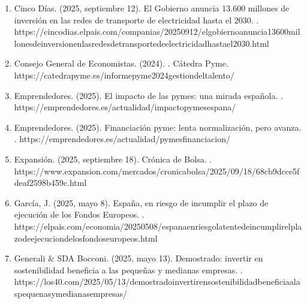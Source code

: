 \documentclass[letterpaper,10pt,spanish]{sphinxmanual}
\begin{document}
\begin{enumerate}
\item {} 
\sphinxAtStartPar
Cinco Días. (2025, septiembre 12). El Gobierno anuncia 13.600 millones de inversión en las redes de transporte de electricidad hasta el 2030. . https://cincodias.elpais.com/companias/2025\sphinxhyphen{}09\sphinxhyphen{}12/el\sphinxhyphen{}gobierno\sphinxhyphen{}anuncia\sphinxhyphen{}13600\sphinxhyphen{}millones\sphinxhyphen{}de\sphinxhyphen{}inversion\sphinxhyphen{}en\sphinxhyphen{}las\sphinxhyphen{}redes\sphinxhyphen{}de\sphinxhyphen{}transporte\sphinxhyphen{}de\sphinxhyphen{}electricidad\sphinxhyphen{}hasta\sphinxhyphen{}el\sphinxhyphen{}2030.html

\item {} 
\sphinxAtStartPar
Consejo General de Economistas. (2024). . Cátedra Pyme. https://catedrapyme.es/informe\sphinxhyphen{}pyme\sphinxhyphen{}2024\sphinxhyphen{}gestion\sphinxhyphen{}del\sphinxhyphen{}talento/

\item {} 
\sphinxAtStartPar
Emprendedores. (2025). El impacto de las pymes: una mirada española. . https://emprendedores.es/actualidad/impacto\sphinxhyphen{}pymes\sphinxhyphen{}espana/

\item {} 
\sphinxAtStartPar
Emprendedores. (2025). Financiación pyme: lenta normalización, pero avanza. . https://emprendedores.es/actualidad/pymes\sphinxhyphen{}financiacion/

\item {} 
\sphinxAtStartPar
Expansión. (2025, septiembre 18). Crónica de Bolsa. . https://www.expansion.com/mercados/cronica\sphinxhyphen{}bolsa/2025/09/18/68cb9dcce5fdeaf2598b459c.html

\item {} 
\sphinxAtStartPar
García, J. (2025, mayo 8). España, en riesgo de incumplir el plazo de ejecución de los Fondos Europeos. . https://elpais.com/economia/2025\sphinxhyphen{}05\sphinxhyphen{}08/espana\sphinxhyphen{}en\sphinxhyphen{}riesgo\sphinxhyphen{}latente\sphinxhyphen{}de\sphinxhyphen{}incumplir\sphinxhyphen{}el\sphinxhyphen{}plazo\sphinxhyphen{}de\sphinxhyphen{}ejecucion\sphinxhyphen{}de\sphinxhyphen{}los\sphinxhyphen{}fondos\sphinxhyphen{}europeos.html

\item {} 
\sphinxAtStartPar
Generali \& SDA Bocconi. (2025, mayo 13). Demostrado: invertir en sostenibilidad beneficia a las pequeñas y medianas empresas. . https://los40.com/2025/05/13/demostrado\sphinxhyphen{}invertir\sphinxhyphen{}en\sphinxhyphen{}sostenibilidad\sphinxhyphen{}beneficia\sphinxhyphen{}a\sphinxhyphen{}las\sphinxhyphen{}pequenas\sphinxhyphen{}y\sphinxhyphen{}medianas\sphinxhyphen{}empresas/


\end{enumerate}
\end{document}
